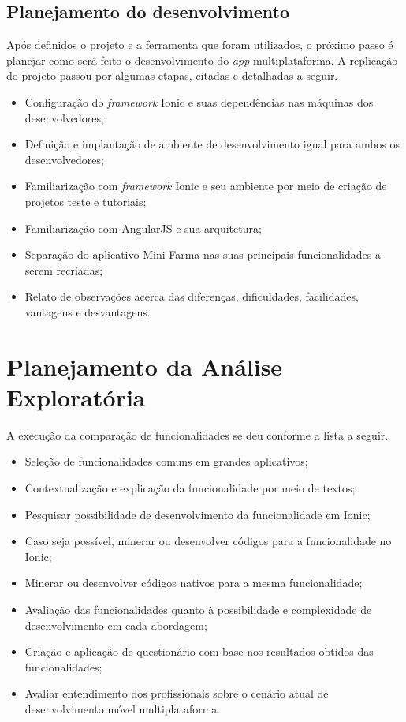 \subsection{Planejamento do desenvolvimento} \label{subsection:planejamentodesenvolvimento}

Após definidos o projeto e a ferramenta que foram utilizados, o próximo passo é planejar como será feito o desenvolvimento do \textit{app} multiplataforma. 
A replicação do projeto passou por algumas etapas, citadas e detalhadas a seguir.

\begin{itemize}
    \item Configuração do \textit{framework} Ionic e suas dependências nas máquinas dos desenvolvedores;
    \item Definição e implantação de ambiente de desenvolvimento igual para ambos os desenvolvedores;
    \item Familiarização com \textit{framework} Ionic e seu ambiente por meio de criação de projetos teste e tutoriais;
    \item Familiarização com AngularJS e sua arquitetura; 
    \item Separação do aplicativo Mini Farma nas suas principais funcionalidades a serem recriadas;
    \item Relato de observações acerca das diferenças, dificuldades, facilidades, vantagens e desvantagens.
\end{itemize}

\section{Planejamento da Análise Exploratória} \label{section:planejamentoanaliseexp}
A execução da comparação de funcionalidades se deu conforme a lista a seguir.

\begin{itemize}
    \item Seleção de funcionalidades comuns em grandes aplicativos;
    \item Contextualização e explicação da funcionalidade por meio de textos;
    \item Pesquisar possibilidade de desenvolvimento da funcionalidade em Ionic;
    \item Caso seja possível, minerar ou desenvolver códigos para a funcionalidade no Ionic;
    \item Minerar ou desenvolver códigos nativos para a mesma funcionalidade;
    \item Avaliação das funcionalidades quanto à possibilidade e complexidade de desenvolvimento em cada abordagem;
    \item Criação e aplicação de questionário com base nos resultados obtidos das funcionalidades;
    \item Avaliar entendimento dos profissionais sobre o cenário atual de desenvolvimento móvel multiplataforma.
\end{itemize}

